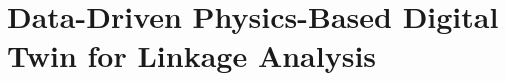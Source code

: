 

% 



% 
\graphicspath{{sections/04_DOJO-CCK_Simulation/}}


\chapter{Data-Driven Physics-Based Digital Twin for Linkage Analysis}



